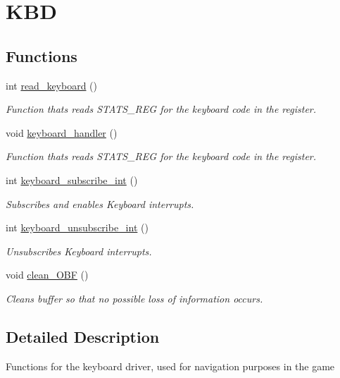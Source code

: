 \hypertarget{group___keyboard}{\section{K\-B\-D}
\label{group___keyboard}
}
\subsection*{Functions}
\begin{DoxyCompactItemize}
\item 
int \hyperlink{group___keyboard_ga8732072f964bec9eb9b22254c239654d}{read\-\_\-keyboard} ()
\begin{DoxyCompactList}\small\item\em Function thats reads S\-T\-A\-T\-S\-\_\-\-R\-E\-G for the keyboard code in the register. \end{DoxyCompactList}\item 
void \hyperlink{group___keyboard_ga2f4098fc71cbd39422c1001d66970bf5}{keyboard\-\_\-handler} ()
\begin{DoxyCompactList}\small\item\em Function thats reads S\-T\-A\-T\-S\-\_\-\-R\-E\-G for the keyboard code in the register. \end{DoxyCompactList}\item 
int \hyperlink{group___keyboard_ga4ac76b0a9a73670254d5fd4c520e458f}{keyboard\-\_\-subscribe\-\_\-int} ()
\begin{DoxyCompactList}\small\item\em Subscribes and enables Keyboard interrupts. \end{DoxyCompactList}\item 
int \hyperlink{group___keyboard_gac95aea27a5e91b363b876fed881f368f}{keyboard\-\_\-unsubscribe\-\_\-int} ()
\begin{DoxyCompactList}\small\item\em Unsubscribes Keyboard interrupts. \end{DoxyCompactList}\item 
void \hyperlink{group___keyboard_ga0046038f5e6b7aa1eb7618e3407b3923}{clean\-\_\-\-O\-B\-F} ()
\begin{DoxyCompactList}\small\item\em Cleans buffer so that no possible loss of information occurs. \end{DoxyCompactList}\end{DoxyCompactItemize}


\subsection{Detailed Description}
Functions for the keyboard driver, used for navigation purposes in the game 

